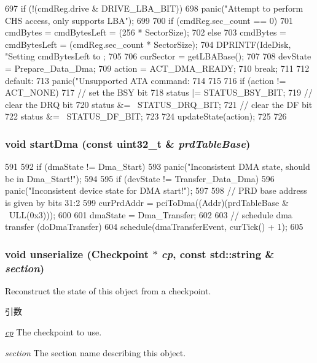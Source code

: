 \begin{DoxyCode}
{{697         if (!(cmdReg.drive & DRIVE_LBA_BIT))
698             panic("Attempt to perform CHS access, only supports LBA\n");
699 
700         if (cmdReg.sec_count == 0)
701             cmdBytes = cmdBytesLeft = (256 * SectorSize);
702         else
703             cmdBytes = cmdBytesLeft = (cmdReg.sec_count * SectorSize);
704         DPRINTF(IdeDisk, "Setting cmdBytesLeft to %
      ;
705 
706         curSector = getLBABase();
707 
708         devState = Prepare_Data_Dma;
709         action = ACT_DMA_READY;
710         break;
711 
712       default:
713         panic("Unsupported ATA command: %
714     }
715 
716     if (action != ACT_NONE) {
717         // set the BSY bit
718         status |= STATUS_BSY_BIT;
719         // clear the DRQ bit
720         status &= ~STATUS_DRQ_BIT;
721         // clear the DF bit
722         status &= ~STATUS_DF_BIT;
723 
724         updateState(action);
725     }
726 }
\end{DoxyCode}
\hypertarget{classIdeDisk_a5f7be8f129b212ec5a0f25ce5c65dbd7}{
\subsubsection[{startDma}]{\setlength{\rightskip}{0pt plus 5cm}void startDma (const {\bf uint32\_\-t} \& {\em prdTableBase})}}
\label{classIdeDisk_a5f7be8f129b212ec5a0f25ce5c65dbd7}



\begin{DoxyCode}
591 {
592     if (dmaState != Dma_Start)
593         panic("Inconsistent DMA state, should be in Dma_Start!\n");
594 
595     if (devState != Transfer_Data_Dma)
596         panic("Inconsistent device state for DMA start!\n");
597 
598     // PRD base address is given by bits 31:2
599     curPrdAddr = pciToDma((Addr)(prdTableBase & ~ULL(0x3)));
600 
601     dmaState = Dma_Transfer;
602 
603     // schedule dma transfer (doDmaTransfer)
604     schedule(dmaTransferEvent, curTick() + 1);
605 }
\end{DoxyCode}
\hypertarget{classIdeDisk_af22e5d6d660b97db37003ac61ac4ee49}{
\subsubsection[{unserialize}]{\setlength{\rightskip}{0pt plus 5cm}void unserialize ({\bf Checkpoint} $\ast$ {\em cp}, \/  const std::string \& {\em section})}}
\label{classIdeDisk_af22e5d6d660b97db37003ac61ac4ee49}
Reconstruct the state of this object from a checkpoint. 
\begin{DoxyParams}{引数}
\item[{\em \hyperlink{namespacecp}{cp}}]The checkpoint to use. \item[{\em section}]The section name describing this object. \end{DoxyParams}


